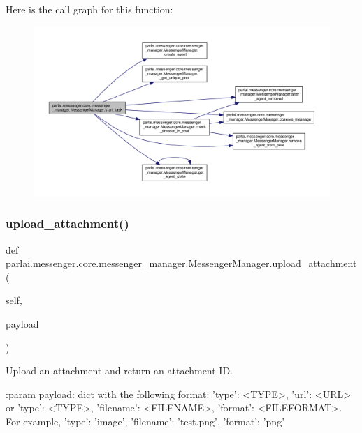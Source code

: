 Here is the call graph for this function\+:
\nopagebreak
\begin{figure}[H]
\begin{center}
\leavevmode
\includegraphics[width=350pt]{classparlai_1_1messenger_1_1core_1_1messenger__manager_1_1MessengerManager_a8bf1afcc5ef1546f32a7ad0d390d0fe1_cgraph}
\end{center}
\end{figure}
\mbox{\label{classparlai_1_1messenger_1_1core_1_1messenger__manager_1_1MessengerManager_ab98d837cddfda4903d5670e06be5a743}} 
\subsubsection{\texorpdfstring{upload\+\_\+attachment()}{upload\_attachment()}}
{\footnotesize\ttfamily def parlai.\+messenger.\+core.\+messenger\+\_\+manager.\+Messenger\+Manager.\+upload\+\_\+attachment (\begin{DoxyParamCaption}\item[{}]{self,  }\item[{}]{payload }\end{DoxyParamCaption})}

\begin{DoxyVerb}Upload an attachment and return an attachment ID.

:param payload:
    dict with the following format:
{'type': <TYPE>, 'url': <URL>} or
{'type': <TYPE>, 'filename': <FILENAME>, 'format': <FILEFORMAT>}.
For example,
{'type': 'image', 'filename': 'test.png', 'format': 'png'}
\end{DoxyVerb}
 

